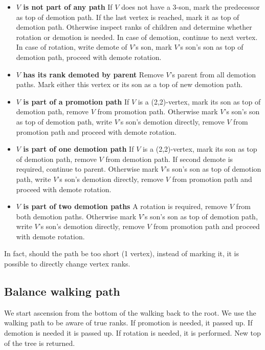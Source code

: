 \begin{itemize}

\item {\bfseries $V$ is not part of any path} If $V$ does not have a 3-son, mark the predecessor as top of demotion path. If the last vertex is reached, mark it as top of demotion path.  Otherwise inspect ranks of children and determine whether rotation or demotion is needed. In case of demotion, continue to next vertex. In case of rotation, write demote of $V$'s son, mark $V$'s son's son as top of demotion path, proceed with demote rotation.

\item {\bfseries $V$ has its rank demoted by parent} Remove $V$'s parent from all demotion paths. Mark either this vertex or its son as a top of new demotion path.

\item {\bfseries $V$ is part of a promotion path} If $V$ is a (2,2)-vertex, mark its son as top of demotion path, remove $V$ from promotion path. Otherwise mark $V$'s son's son as top of demotion path, write $V$'s son's demotion directly, remove $V$ from promotion path and proceed with demote rotation. 

\item {\bfseries $V$ is part of one demotion path} If $V$ is a (2,2)-vertex, mark its son as top of demotion path, remove $V$ from demotion path. If second demote is required, continue to parent. Otherwise mark $V$'s son's son as top of demotion path, write $V$'s son's demotion directly, remove $V$ from promotion path and proceed with demote rotation. 

\item {\bfseries $V$ is part of two demotion paths} A rotation is required, remove $V$ from both demotion paths. Otherwise mark $V$'s son's son as top of demotion path, write $V$'s son's demotion directly, remove $V$ from promotion path and proceed with demote rotation.

\end{itemize}

In fact, should the path be too short (1 vertex), instead of marking it, it is possible to directly change vertex ranks.

\subsection{Balance walking path}

We start ascension from the bottom of the walking back to the root. We use the walking path to be aware of true ranks. If promotion is needed, it passed up. If demotion is needed it is passed up. If rotation is needed, it is performed. New top of the tree is returned. 

